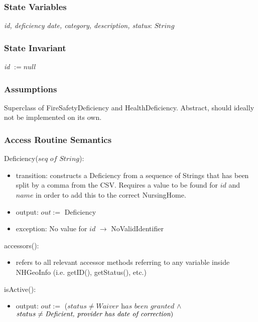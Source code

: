 \documentclass[12pt]{article}
\begin{document}
\subsubsection* {State Variables}

\textit{id, deficiency date,  category, description,  status}: $String$\\

\subsubsection* {State Invariant}

\textit{id} $:= null$

\subsubsection* {Assumptions}
\noindent Superclass of FireSafetyDeficiency and HealthDeficiency. Abstract, should ideally not be implemented on its own.

\subsubsection* {Access Routine Semantics}
Deficiency($\textit{seq of String}$):
\begin{itemize}
\item transition: constructs a Deficiency from a sequence of Strings that has been split by a comma from the CSV. Requires a value to be found for $id$ and $name$ in order to add this to the correct NursingHome.
\item output: $out := $ Deficiency
\item exception: No value for $id$ $\rightarrow$ NoValidIdentifier
\end{itemize}

\noindent accessors():
\begin{itemize}
\item refers to all relevant accessor methods referring to any variable inside NHGeoInfo (i.e. getID(), getStatus(),  etc.)
\end{itemize}

\noindent isActive():
\begin{itemize}
\item output: $out := $ ($status \neq \textit{Waiver has been granted}$  $ \land $ $\\
status \neq \textit{Deficient, provider has date of correction})$
\end{itemize}
\end{document}
